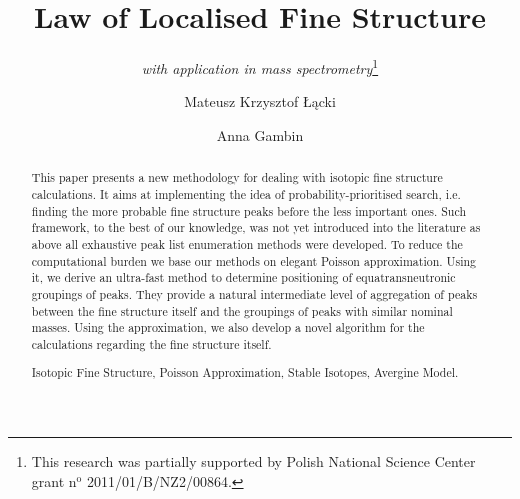 \documentclass[runningheads,a4paper]{llncs}
\newcommand{\keywords}[1]{\par\addvspace\baselineskip
\noindent\keywordname\enspace\ignorespaces#1}
\begin{document}
\mainmatter  

\title{Law of Localised Fine Structure}

\subtitle{\textit{with application in mass spectrometry}\thanks{
	This research was partially supported by Polish National Science Center grant $\text{n}^\text{o}$ 2011/01/B/NZ2/00864.
}}



\author{Mateusz Krzysztof \L\k{a}cki
\and Anna Gambin}





\maketitle

\begin{abstract}
	This paper presents a new methodology for dealing with isotopic fine structure calculations. It aims at implementing the idea of probability-prioritised search, i.e. finding the more probable fine structure peaks before the less important ones. Such framework, to the best of our knowledge, was not yet introduced into the literature as above all exhaustive peak list enumeration methods were developed. To reduce the computational burden we base our methods on elegant Poisson approximation. Using it, we derive an ultra-fast method to determine positioning of equatransneutronic groupings of peaks. They provide a natural intermediate level of aggregation of peaks between the fine structure itself and the groupings of peaks with similar nominal masses. Using the approximation, we also develop a novel algorithm for the calculations regarding the fine structure itself.       
\keywords{Isotopic Fine Structure, Poisson Approximation, Stable Isotopes, Avergine Model.}
\end{abstract}
\end{document}
